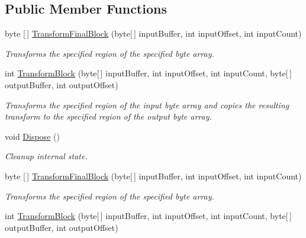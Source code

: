 \subsection*{Public Member Functions}
\begin{DoxyCompactItemize}
\item 
byte \mbox{[}$\,$\mbox{]} \hyperlink{class_i_c_sharp_code_1_1_sharp_zip_lib_1_1_encryption_1_1_pkzip_classic_encrypt_crypto_transform_acd0c2773f62f5a8e19f75c0da7e61313}{Transform\+Final\+Block} (byte\mbox{[}$\,$\mbox{]} input\+Buffer, int input\+Offset, int input\+Count)
\begin{DoxyCompactList}\small\item\em Transforms the specified region of the specified byte array. \end{DoxyCompactList}\item 
int \hyperlink{class_i_c_sharp_code_1_1_sharp_zip_lib_1_1_encryption_1_1_pkzip_classic_encrypt_crypto_transform_ad92aae5d13e93e0efb9dfbb2e00a9588}{Transform\+Block} (byte\mbox{[}$\,$\mbox{]} input\+Buffer, int input\+Offset, int input\+Count, byte\mbox{[}$\,$\mbox{]} output\+Buffer, int output\+Offset)
\begin{DoxyCompactList}\small\item\em Transforms the specified region of the input byte array and copies the resulting transform to the specified region of the output byte array. \end{DoxyCompactList}\item 
void \hyperlink{class_i_c_sharp_code_1_1_sharp_zip_lib_1_1_encryption_1_1_pkzip_classic_encrypt_crypto_transform_a1bce7b77d9ddb31a669bee6547167118}{Dispose} ()
\begin{DoxyCompactList}\small\item\em Cleanup internal state. \end{DoxyCompactList}\item 
byte \mbox{[}$\,$\mbox{]} \hyperlink{class_i_c_sharp_code_1_1_sharp_zip_lib_1_1_encryption_1_1_pkzip_classic_encrypt_crypto_transform_acd0c2773f62f5a8e19f75c0da7e61313}{Transform\+Final\+Block} (byte\mbox{[}$\,$\mbox{]} input\+Buffer, int input\+Offset, int input\+Count)
\begin{DoxyCompactList}\small\item\em Transforms the specified region of the specified byte array. \end{DoxyCompactList}\item 
int \hyperlink{class_i_c_sharp_code_1_1_sharp_zip_lib_1_1_encryption_1_1_pkzip_classic_encrypt_crypto_transform_ad92aae5d13e93e0efb9dfbb2e00a9588}{Transform\+Block} (byte\mbox{[}$\,$\mbox{]} input\+Buffer, int input\+Offset, int input\+Count, byte\mbox{[}$\,$\mbox{]} output\+Buffer, int output\+Offset)

\end{DoxyCompactItemize}

